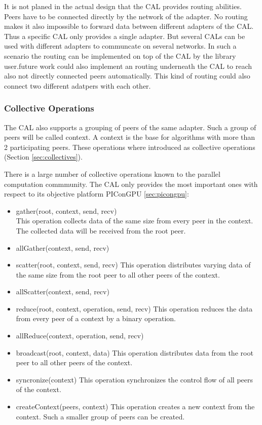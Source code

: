 It is not planed in the actual design that the CAL provides routing
abilities. Peers have to be connected directly by the network of the
adapter. No routing makes it also impossible to forward data between
different adapters of the CAL. Thus a specific CAL only provides a
single adapter. But several CALs can be used with different adapters
to communcate on several networks. In such a scenario the routing can
be implemented on top of the CAL by the library user.future work could
also implement an routing underneath the CAL to reach also not
directly connected peers automatically. This kind of routing
could also connect two different adatpers with each other.

\subsubsection{Collective Operations}
The CAL also supports a grouping of peers of the same adapter. Such a
group of peers will be called context. A context is the base for
algorithms with more than 2 participating peers. These operations
where introduced as collective operations (Section \ref{sec:collectives}). 

There is a large number of collective operations known to the
parallel computation commmunity. The CAL only provides the most
important ones with respect to its objective platform PIConGPU \ref{sec:picongpu}:

\begin{itemize}
\item gather(root, context, send, recv)\\
  This operation collects data of the same size from
  every peer in the context. The collected data will be
  received from the root peer.
\item allGather(context, send, recv)
\item scatter(root, context, send, recv)
  This operation distributes varying data of the same size from the root peer to
  all other peers of the context.
\item allScatter(context, send, recv)

\item reduce(root, context, operation, send, recv)
  This operation reduces the data from every peer of a context by
  a binary operation.
\item allReduce(context, operation, send, recv)

\item broadcast(root, context, data)
  This operation distributes data from the root peer to
  all other peers of the context.
\item syncronize(context)
  This operation synchronizes the control flow of all peers of the context.
\item createContext(peers, context)
  This operation creates a new context from the context. Such a smaller
  group of peers can be created.
\end{itemize}



